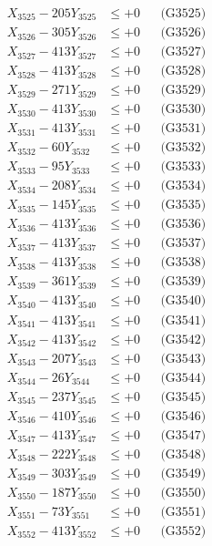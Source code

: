 \documentclass[a4paper,10pt]{article}
\begin{document}
{\begin{align}
X_{3525} - 205Y_{3525} &\leq +0 && \text{(G3525)} \\
X_{3526} - 305Y_{3526} &\leq +0 && \text{(G3526)} \\
X_{3527} - 413Y_{3527} &\leq +0 && \text{(G3527)} \\
X_{3528} - 413Y_{3528} &\leq +0 && \text{(G3528)} \\
X_{3529} - 271Y_{3529} &\leq +0 && \text{(G3529)} \\
X_{3530} - 413Y_{3530} &\leq +0 && \text{(G3530)} \\
\allowbreak
X_{3531} - 413Y_{3531} &\leq +0 && \text{(G3531)} \\
X_{3532} - 60Y_{3532} &\leq +0 && \text{(G3532)} \\
X_{3533} - 95Y_{3533} &\leq +0 && \text{(G3533)} \\
X_{3534} - 208Y_{3534} &\leq +0 && \text{(G3534)} \\
X_{3535} - 145Y_{3535} &\leq +0 && \text{(G3535)} \\
X_{3536} - 413Y_{3536} &\leq +0 && \text{(G3536)} \\
X_{3537} - 413Y_{3537} &\leq +0 && \text{(G3537)} \\
X_{3538} - 413Y_{3538} &\leq +0 && \text{(G3538)} \\
X_{3539} - 361Y_{3539} &\leq +0 && \text{(G3539)} \\
X_{3540} - 413Y_{3540} &\leq +0 && \text{(G3540)} \\
\allowbreak
X_{3541} - 413Y_{3541} &\leq +0 && \text{(G3541)} \\
X_{3542} - 413Y_{3542} &\leq +0 && \text{(G3542)} \\
X_{3543} - 207Y_{3543} &\leq +0 && \text{(G3543)} \\
X_{3544} - 26Y_{3544} &\leq +0 && \text{(G3544)} \\
X_{3545} - 237Y_{3545} &\leq +0 && \text{(G3545)} \\
X_{3546} - 410Y_{3546} &\leq +0 && \text{(G3546)} \\
X_{3547} - 413Y_{3547} &\leq +0 && \text{(G3547)} \\
X_{3548} - 222Y_{3548} &\leq +0 && \text{(G3548)} \\
X_{3549} - 303Y_{3549} &\leq +0 && \text{(G3549)} \\
X_{3550} - 187Y_{3550} &\leq +0 && \text{(G3550)} \\
\allowbreak
X_{3551} - 73Y_{3551} &\leq +0 && \text{(G3551)} \\
X_{3552} - 413Y_{3552} &\leq +0 && \text{(G3552)} \\

\end{align}}
\end{document}
